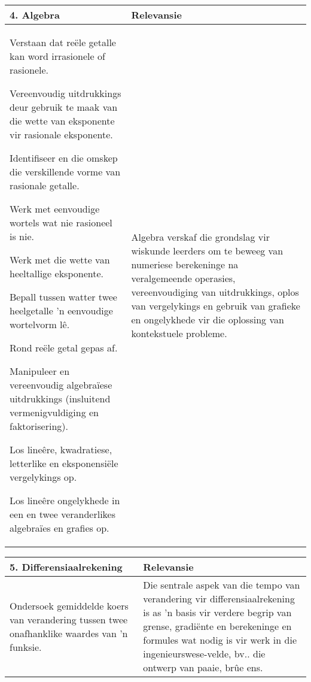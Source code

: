 \begin{table}[H]
\begin{center} 
\begin{tabular}{|p{8.5cm}|p{3.5cm}|} \hline
\textbf{4. Algebra}&\textbf{Relevansie}  \\ \hline  
Verstaan ​​dat re\"{e}le getalle kan word irrasionele of rasionele.\par
Vereenvoudig uitdrukkings deur gebruik te maak van die wette van eksponente vir rasionale eksponente.\par
Identifiseer en die omskep die verskillende vorme van rasionale getalle.\par
Werk met eenvoudige wortels wat nie rasioneel is nie.\par
Werk met die wette van heeltallige eksponente.\par
Bepall tussen watter twee heelgetalle 'n eenvoudige wortelvorm l\^{e}.\par
Rond re\"{e}le getal gepas af.\par
Manipuleer en vereenvoudig algebra\"{i}ese uitdrukkings (insluitend vermenigvuldiging en faktorisering).\par
Los line\^{e}re, kwadratiese, letterlike en eksponensi\"{e}le vergelykings op.\par
Los line\^{e}re ongelykhede in een en twee veranderlikes algebra\"{i}es en grafies op.\par
&
Algebra verskaf die grondslag vir wiskunde leerders om te beweeg van
numeriese berekeninge na veralgemeende operasies, vereenvoudiging
van uitdrukkings, oplos van vergelykings en gebruik van
grafieke en ongelykhede vir die oplossing van kontekstuele probleme.
\\ \hline

 \end{tabular}
\end{center}
\end{table}

\begin{table}[H]
 \begin{center} 
\begin{tabular}{|p{8.5cm}|p{3.5cm}|} \hline
\textbf{5. Differensiaalrekening}& \textbf{Relevansie}\\ \hline  
Ondersoek gemiddelde koers van verandering tussen twee onafhanklike
waardes van 'n funksie.
&
Die sentrale aspek van die tempo van verandering vir
differensiaalrekening is as 'n basis vir verdere begrip van grense,
gradi\"{e}nte en berekeninge en formules wat nodig is vir werk in die
ingenieurswese-velde, bv.. die ontwerp van paaie, br\^{u}e ens.
\\ \hline

 \end{tabular}
\end{center}
\end{table}

